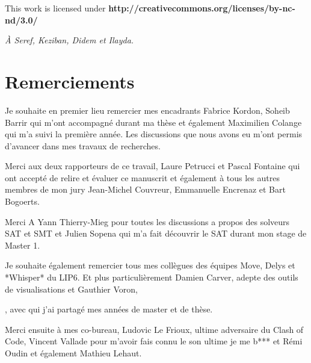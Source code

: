 \clearpage\null\vfill
\thispagestyle{empty}
\begin{minipage}[b]{.9\textwidth}
  \begin{center}
  \setlength{\parskip}{.5\baselineskip}
  {\color{phdcol0}%
   \ccLogo\hspace{.1cm}%
   \ccAttribution\hspace{.1cm}%
   \ccNonCommercial\hspace{.1cm}%
   \ccNoDerivatives}\hspace{.15cm}%
  \footnotesize%
  This work is licensed under {\color{phdcol1}\textbf{http://creativecommons.org/licenses/by-nc-nd/3.0/}}
  \end{center}
\end{minipage}
\vspace*{2\baselineskip}
\clearpage
\thispagestyle{empty}
\begin{flushright}
  \textit{À Seref, Keziban, Didem et Ilayda.}
\end{flushright}
%

\chapter*{Remerciements}

Je souhaite en premier lieu remercier mes encadrants Fabrice Kordon, 
Soheib Barrir qui m'ont accompagné durant ma thèse et également  Maximilien Colange
qui m'a suivi la première année.
Les discussions que nous avons eu m'ont permis d'avancer dans mes travaux de recherches.

Merci aux deux rapporteurs de ce travail, 
Laure Petrucci et Pascal Fontaine qui ont accepté de relire et évaluer ce manuscrit et également à 
tous les autres membres de mon jury Jean-Michel Couvreur, Emmanuelle Encrenaz et Bart Bogoerts.


Merci A Yann Thierry-Mieg pour toutes les discussions a propos des solveurs SAT et SMT et 
Julien Sopena  qui m'a fait découvrir le SAT durant mon stage de Master 1.


Je souhaite également remercier tous mes collègues des équipes Move, Delys et *Whisper* du LIP6.
Et plus particulièrement Damien Carver, adepte des outils de visualisations et Gauthier Voron, 

, avec qui j'ai partagé mes années de master et de thèse.


Merci ensuite à mes co-bureau, Ludovic Le Frioux, ultime adversaire du Clash of Code,
Vincent Vallade pour m'avoir fais connu le son ultime je me b*** et Rémi Oudin et également
Mathieu Lehaut.

